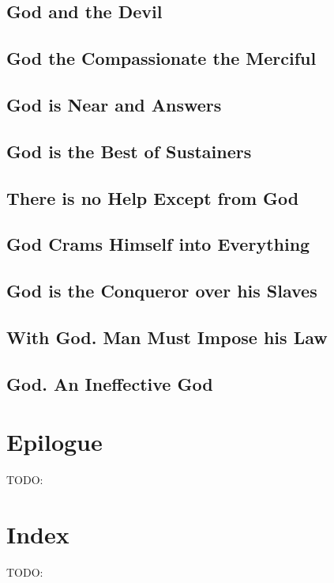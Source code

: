 \documentclass[12pt]{book}
\begin{document}
\section{God and the Devil}

\section{God the Compassionate the Merciful}

\section{God is Near and Answers}

\section{God is the Best of Sustainers}

\section{There is no Help Except from God}

\section{God Crams Himself into Everything}

\section{God is the Conqueror over his Slaves}

\section{With God. Man Must Impose his Law}

\section{God. An Ineffective God}

\backmatter

\chapter{Epilogue}
TODO:

\chapter{Index}
TODO:
\end{document}
